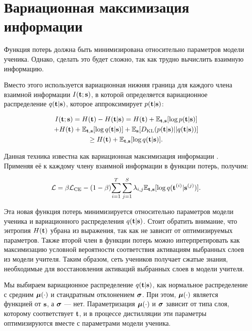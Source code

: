 
\section{Вариационная максимизация информации}

Функция потерь должна быть минимизирована относительно параметров модели ученика. Однако, сделать это будет сложно, так как трудно вычислить взаимную информацию.

Вместо этого используется вариационная нижняя граница для каждого члена взаимной информации $I(\bold{t}; \bold{s})$,
в которой определяется вариационное распределение $q(\bold{t}|\bold{s})$, которое аппроксимирует $p(\bold{t}|\bold{s})$:

\begin{multline}
  I(\bold{t}; \bold{s}) = H(\bold{t}) - H(\bold{t} | \bold{s}) =  H(\bold{t}) + \mathbb{E}_{\bold{t},\bold{s}}[\log{p(\bold{t}|\bold{s})}] \\
  + H(\bold{t}) + \mathbb{E}_{\bold{t},\bold{s}}[\log{q(\bold{t}|\bold{s})}] + \mathbb{E}_{\bold{s}}[D_{\text{KL}}(p(\bold{t}|\bold{s})||q(\bold{t}|\bold{s}))] \\
  \geq H(\bold{t}) + \mathbb{E}_{\bold{t},\bold{s}}[\log{q(\bold{t}|\bold{s})}].
\end{multline}

Данная техника известна как вариационная максимизация информации \cite{barber2004algorithm}. Применяя её к каждому члену взаимной информации в функции потерь, получим:

$$ \mathcal{L} = \beta \mathcal{L}_\text{CE} - (1 - \beta){\sum_{i=1}^T \sum_{j=1}^S \lambda_{i, j} \mathbb{E}_{\bold{t},\bold{s}}[\log{q(\bold{t}^{(i)}|\bold{s}^{(j)})}] }.$$

Эта новая функция потерь минимизируется относительно параметров модели ученика и вариационного распределения $q(\bold{t}|\bold{s})$.
Стоит обратить внимание, что энтропия $H(\bold{t})$ убрана из выражения, так как не зависит от оптимизируемых параметров.
Также второй член в функции потерь можно интерпретировать как максимизацию условной вероятности
соответствия активациям выбранных слоев из модели учителя.
Таким образом, сеть учеников получает сжатые знания, необходимые для восстановления активаций выбранных слоев в модели учителя.

Мы выбираем вариационное распределение $q(\bold{t}|\bold{s})$, как нормальное распределение с средним $\boldsymbol{\mu}(\cdot)$ и
стандратным отклонением $\boldsymbol{\sigma}$. При этом,  $\boldsymbol{\mu}(\cdot)$ является функцией от $\bold{s}$, а $\boldsymbol{\sigma}$ --- нет.
Параметризация  $\boldsymbol{\mu}(\cdot)$ и $\boldsymbol{\sigma}$ зависит от типа слоя, которому соответствует $\bold{t}$,
и в процессе дистилляции эти параметры оптимизируются вместе с параметрами модели ученика.

